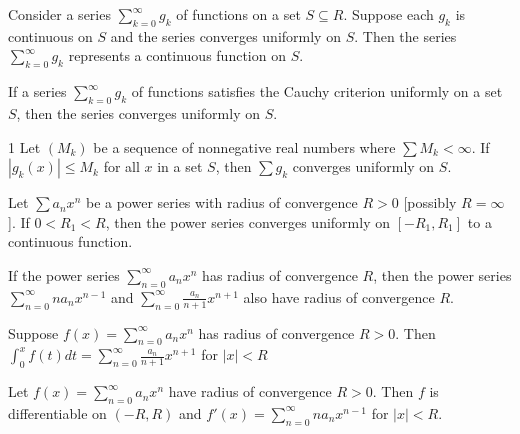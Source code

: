 \begin{theo}{1}
	Consider a series $\sum_{k=0}^{\infty}g_k$ of functions on a set $S \subseteq R$. Suppose each $g_k$ is continuous on $S$ and the series converges uniformly on $S$. Then the series $\sum_{k=0}^{\infty}g_k$ represents a continuous function on $S$.
\end{theo}

\begin{theo}{1}
	If a series	$\sum_{k=0}^{\infty}g_k$ of functions satisfies the Cauchy criterion uniformly on a set $S$, then the series converges uniformly on $S$.
\end{theo}

\begin{defn}{1}
	Let $(M_k)$ be a sequence of nonnegative real numbers where $\sum M_k < \infty$. If $|g_k(x)| \leq M_k$ for all $x$ in a set $S$, then $\sum g_k$ converges uniformly on $S$.
\end{defn}

\begin{defn}{1}
	Let $\sum a_n x^n$ be a power series with radius of convergence $R > 0$
	[possibly $R = \infty$]. If $0 < R_1 < R$, then the power series converges uniformly on $[-R_1 , R_1]$ to a continuous function.
\end{defn}

\begin{theo}{1}
	If the power series $\sum_{n=0}^{\infty}a_nx^n$ has radius of convergence $R$, then the power series $\sum_{n=0}^{\infty}na_nx^{n-1}$ and $\sum_{n=0}^{\infty}\frac{a_n}{n+1}x^{n+1}$	also have radius of convergence $R$.
\end{theo}

\begin{theo}{1}
	Suppose $f (x) = \sum_{n=0}^{\infty} a_n x^n$ has radius of convergence $R > 0$. Then $\int_{0}^{x}f(t)dt = \sum_{n=0}^{\infty}\frac{a_n}{n+1}x^{n+1}$ for $|x|<R$
\end{theo}

\begin{theo}{1}
	Let $f(x) = \sum_{n=0}^{\infty} a_n x^n$ have radius of convergence $R > 0$. Then $f$ is differentiable on $(-R, R)$ and $f'(x) = \sum_{n=0}^{\infty} na_nx^{n-1}$ for $|x|<R$.
\end{theo}

